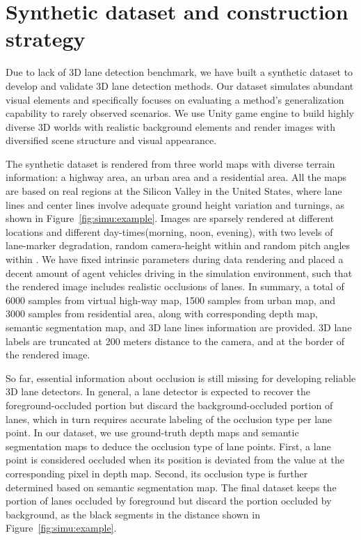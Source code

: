 \documentclass[10pt,twocolumn,letterpaper]{article}
\begin{document}
\section{Synthetic dataset and construction strategy}
\label{sec:data}



Due to lack of 3D lane detection benchmark, we have built a synthetic dataset to develop and validate 3D lane detection methods. Our dataset simulates abundant visual elements and specifically focuses on evaluating a method's generalization capability to rarely observed scenarios. We use Unity game engine to build highly diverse 3D worlds with realistic background elements and render images with diversified scene structure and visual appearance.

The synthetic dataset is rendered from three world maps with diverse terrain information: a highway area, an urban area and a residential area. All the maps are based on real regions at the Silicon Valley in the United States, where lane lines and center lines involve adequate ground height variation and turnings, as shown in Figure~\ref{fig:simu:example}. Images are sparsely rendered at different locations and different day-times(morning, noon, evening), with two levels of lane-marker degradation, random camera-height within  and random pitch angles within . We have fixed intrinsic parameters during data rendering and placed a decent amount of agent vehicles driving in the simulation environment, such that the rendered image includes realistic occlusions of lanes. In summary, a total of 6000 samples from virtual high-way map, 1500 samples from urban map, and 3000 samples from residential area, along with corresponding depth map, semantic segmentation map, and 3D lane lines information are provided. 3D lane labels are truncated at 200 meters distance to the camera, and at the border of the rendered image.

So far, essential information about occlusion is still missing for developing reliable 3D lane detectors. In general, a lane detector is expected to recover the foreground-occluded portion but discard the background-occluded portion of lanes, which in turn requires accurate labeling of the occlusion type per lane point. In our dataset, we use ground-truth depth maps and semantic segmentation maps to deduce the occlusion type of lane points. First, a lane point is considered occluded when its  position is deviated from the value at the corresponding pixel in depth map. Second, its occlusion type is further determined based on semantic segmentation map. The final dataset keeps the portion of lanes occluded by foreground but discard the portion occluded by background, as the black segments in the distance shown in Figure~\ref{fig:simu:example}.
\end{document}
